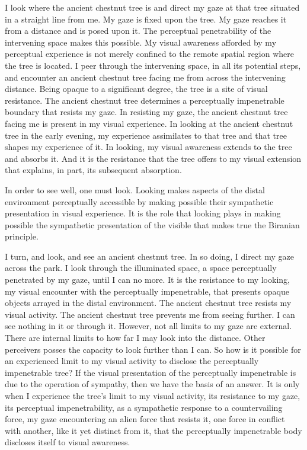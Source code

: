 I look where the ancient chestnut tree is and direct my gaze at that tree situated in a straight line from me. My gaze is fixed upon the tree. My gaze reaches it from a distance and is posed upon it. The perceptual penetrability of the intervening space makes this possible. My visual awareness afforded by my perceptual experience is not merely confined to the remote spatial region where the tree is located. I peer through the intervening space, in all its potential steps, and encounter an ancient chestnut tree facing me from across the intervening distance. Being opaque to a significant degree, the tree is a site of visual resistance. The ancient chestnut tree determines a perceptually impenetrable boundary that resists my gaze. In resisting my gaze, the ancient chestnut tree facing me is present in my visual experience. In looking at the ancient chestnut tree in the early evening, my experience assimilates to that tree and that tree shapes my experience of it. In looking, my visual awareness extends to the tree and absorbs it. And it is the resistance that the tree offers to my visual extension that explains, in part, its subsequent absorption.

In order to see well, one must look. Looking makes aspects of the distal environment perceptually accessible by making possible their sympathetic presentation in visual experience. It is the role that looking plays in making possible the sympathetic presentation of the visible that makes true the Biranian principle.

I turn, and look, and see an ancient chestnut tree. In so doing, I direct my gaze across the park. I look through the illuminated space, a space perceptually penetrated by my gaze, until I can no more. It is the resistance to my looking, my visual encounter with the perceptually impenetrable, that presents opaque objects arrayed in the distal environment. The ancient chestnut tree resists my visual activity. The ancient chestnut tree prevents me from seeing further. I can see nothing in it or through it. However, not all limits to my gaze are external. There are internal limits to how far I may look into the distance. Other perceivers posses the capacity to look further than I can. So how is it possible for an experienced limit to my visual activity to disclose the perceptually impenetrable tree? If the visual presentation of the perceptually impenetrable is due to the operation of sympathy, then we have the basis of an answer. It is only when I experience the tree's limit to my visual activity, its resistance to my gaze, its perceptual impenetrability, as a sympathetic response to a countervailing force, my gaze encountering an alien force that resists it, one force in conflict with another, like it yet distinct from it, that the perceptually impenetrable body discloses itself to visual awareness.

